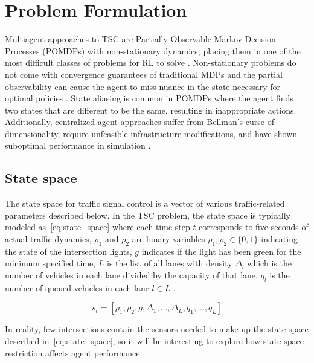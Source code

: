 \documentclass[letterpaper]{article} %
\begin{document}
\section{Problem Formulation}
Multiagent approaches to TSC are Partially Observable Markov Decision Processes (POMDPs) with non-stationary dynamics, placing them in one of the most difficult classes of problems for RL to solve \cite{Almeida2022MultiagentRL} \cite{DBLP:journals/corr/abs-2004-04778} \cite{choi1999environment}.
Non-stationary problems do not come with convergence guarantees of traditional MDPs and the partial observability can cause the agent to miss nuance in the state necessary for optimal policies \cite{choi1999environment} \cite{10.3389/frai.2022.805823}.
State aliasing is common in POMDPs where the agent finds two states that are different to be the same, resulting in inappropriate actions.
Additionally, centralized agent approaches suffer from Bellman's curse of dimensionality, require unfeasible infrastructure modifications, and have shown suboptimal performance in simulation \cite{DBLP:journals/corr/abs-2004-04778} \cite{ault2021reinforcement}.

\subsection{State space}
The state space for traffic signal control is a vector of various traffic-related parameters described below.
In the TSC problem, the state space is typically modeled as~\ref{eq:state_space} where each time step \(t\) corresponds to five seconds of actual traffic dynamics, \(\rho_1\) and \(\rho_2\) are binary variables \(\rho_1, \rho_2 \in \{0, 1\}\) indicating the state of the intersection lights, \(g\) indicates if the light has been green for the minimum specified time, \(L\) is the list of all lanes with density \(\Delta_l\) which is the number of vehicles in each lane divided by the capacity of that lane.
\(q_l\) is the number of queued vehicles in each lane \(l \in L\) \cite{Almeida2022MultiagentRL}.

\begin{equation}
s_t = [\rho_1, \rho_2, g, \Delta_1, \ldots, \Delta_L, q_1, \ldots, q_L]
\label{eq:state_space}
\end{equation}

In reality, few intersections contain the sensors needed to make up the state space described in~\ref{eq:state_space}, so it will be interesting to explore how state space restriction affects agent performance.
\end{document}
